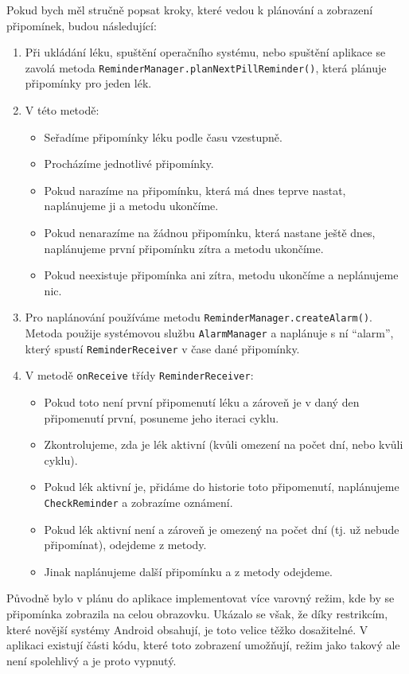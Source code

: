 \documentclass[../TakeYourPill.tex]{subfiles}
\begin{document}
Pokud bych měl stručně popsat kroky, které vedou k plánování a zobrazení připomínek, budou následující:

\begin{enumerate}
  \item Při ukládání léku, spuštění operačního systému, nebo spuštění aplikace se zavolá metoda \texttt{ReminderManager.planNextPillReminder()}, která plánuje připomínky pro jeden lék.
  \item V této metodě:
  \begin{itemize}
    \item Seřadíme připomínky léku podle času vzestupně.
    \item Procházíme jednotlivé připomínky.
    \item Pokud narazíme na připomínku, která má dnes teprve nastat, naplánujeme ji a metodu ukončíme.
    \item Pokud nenarazíme na žádnou připomínku, která nastane ještě dnes, naplánujeme první připomínku zítra a metodu ukončíme.
    \item Pokud neexistuje připomínka ani zítra, metodu ukončíme a neplánujeme nic.
  \end{itemize}
  \item Pro naplánování používáme metodu \texttt{ReminderManager.createAlarm()}. Metoda použije systémovou službu \texttt{AlarmManager} a naplánuje s ní \enquote{alarm}, který spustí \texttt{ReminderReceiver} v čase dané připomínky.
  \item V metodě \texttt{onReceive} třídy \texttt{ReminderReceiver}:
  \begin{itemize}
    \item Pokud toto není první připomenutí léku a zároveň je v daný den připomenutí první, posuneme jeho iteraci cyklu.
    \item Zkontrolujeme, zda je lék aktivní (kvůli omezení na počet dní, nebo kvůli cyklu).
    \item Pokud lék aktivní je, přidáme do historie toto připomenutí, naplánujeme \texttt{CheckReminder} a zobrazíme oznámení.
    \item Pokud lék aktivní není a zároveň je omezený na počet dní (tj. už nebude připomínat), odejdeme z metody.
    \item Jinak naplánujeme další připomínku a z metody odejdeme.
  \end{itemize}
\end{enumerate}

Původně bylo v plánu do aplikace implementovat více varovný režim, kde by se připomínka zobrazila na celou obrazovku. Ukázalo se však, že díky restrikcím, které novější systémy Android obsahují, je toto velice těžko dosažitelné. V aplikaci existují části kódu, které toto zobrazení umožňují, režim jako takový ale není spolehlivý a je proto vypnutý.
\end{document}
